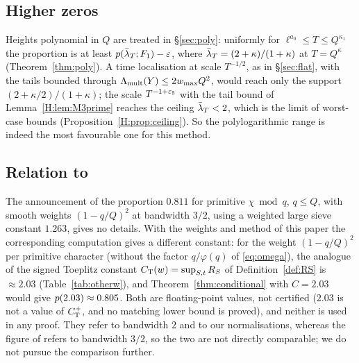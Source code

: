 \documentclass[11pt]{amsart}
\theoremstyle{definition}
\theoremstyle{remark}
\numberwithin{equation}{section}
\begin{document}
\subsection{Higher zeros}\label{sec:higherzeros}
Heights polynomial in $Q$ are treated in \S\ref{sec:poly}: uniformly for $\ell^{a_0}\le T\le Q^{\kappa_1}$ the proportion is at least $p(\bar\lambda_T;F_1)-\varepsilon$, where $\bar\lambda_T=(2+\kappa)/(1+\kappa)$ at $T=Q^\kappa$ (Theorem~\ref{thm:poly}). A time localisation at scale $T^{-1/2}$, as in \S\ref{sec:flat}, with the tails bounded through $\Lambda_{\mathrm{mult}}(Y)\le2w_{\max} Q^2$, would reach only the support $(2+\kappa/2)/(1+\kappa)$; the scale $T^{-1+\varepsilon_5}$ with the tail bound of Lemma~\ref{H:lem:M3prime} reaches the ceiling $\bar\lambda_T<2$, which is the limit of worst-case bounds (Proposition~\ref{H:prop:ceiling}). So the polylogarithmic range is indeed the most favourable one for this method.

\subsection{Relation to \cite[Remark~7.2]{AF26}}\label{rem:AF72}
The announcement \cite[Remark~7.2]{AF26} of the proportion $0.811$ for primitive $\chi\bmod q$, $q\le Q$, with smooth weights $(1-q/Q)^2$ at bandwidth $3/2$, using a weighted large sieve constant $1.263$, gives no details. With the weights and method of this paper the corresponding computation gives a different constant: for the weight $(1-q/Q)^2$ per primitive character (without the factor $q/\varphi(q)$ of \eqref{eq:omega}), the analogue of the signed Toeplitz constant $C_{\mathrm T}(w)=\sup_{S,t}R_S$ of Definition~\ref{def:RS} is $\approx2.03$ (Table~\ref{tab:otherw}), and Theorem~\ref{thm:conditional} with $C=2.03$ would give $p(2.03)\approx0.805$. Both are floating-point values, not certified ($2.03$ is not a value of $C^{+}_{\mathrm T}$, and no matching lower bound is proved), and neither is used in any proof. They refer to bandwidth $2$ and to our normalisations, whereas the figure of \cite{AF26} refers to bandwidth $3/2$, so the two are not directly comparable; we do not pursue the comparison further.
\end{document}

